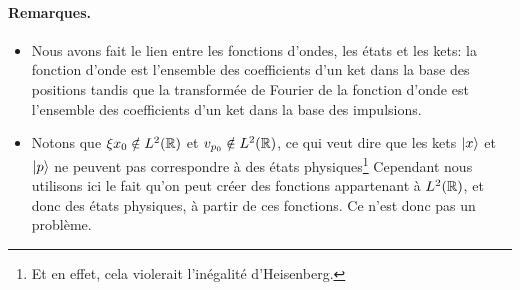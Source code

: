 \documentclass[11pt,a4paper,oneside]{article}
\begin{document}
\paragraph{Remarques.}
\begin{itemize}[label=\tb]
    \item Nous avons fait le lien entre les fonctions d'ondes, les états et les kets: la fonction d'onde est l'ensemble des coefficients d'un ket dans la base des positions tandis que la transformée de Fourier de la fonction d'onde est l'ensemble des coefficients d'un ket dans la base des impulsions.
    \item Notons que $\xi{x_0}\notin L^2(\mathbb{R})$ et $v_{p_0}\notin L^2(\mathbb{R})$, ce qui veut dire que les kets $\ket{x}$ et $\ket{p}$ ne peuvent pas correspondre à des états physiques\footnote{Et en effet, cela violerait l'inégalité d'Heisenberg.} Cependant nous utilisons ici le fait qu'on peut créer des fonctions appartenant à $L^2(\mathbb{R})$, et donc des états physiques, à partir de ces fonctions. Ce n'est donc pas un problème.
\end{itemize}
\end{document}

